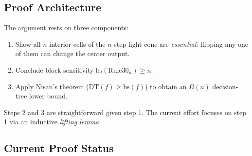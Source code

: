 \documentclass[11pt]{article}
\begin{document}
\subsection{Proof Architecture}

The argument rests on three components:

\begin{enumerate}
    \item Show all $n$ interior cells of the $n$-step light cone are \emph{essential}: flipping any one of them can change the center output.
    \item Conclude block sensitivity $\text{bs}(\text{Rule30}_n) \geq n$.
    \item Apply Nisan's theorem ($\text{DT}(f) \geq \text{bs}(f)$) to obtain an $\Omega(n)$ decision-tree lower bound.
\end{enumerate}

Steps 2 and 3 are straightforward given step 1. The current effort focuses on step 1 via an inductive \emph{lifting lemma}.

\subsection{Current Proof Status}
\end{document}
